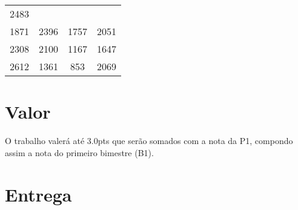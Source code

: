 \documentclass[a4paper]{article}
\begin{document}
\begin{longtable}[c]{@{}cccc@{}}
\begin{minipage}[t]{0.06\columnwidth}
2483
\strut\end{minipage}\tabularnewline
\begin{minipage}[t]{0.06\columnwidth}\centering\strut
1871
\strut\end{minipage} &
\begin{minipage}[t]{0.06\columnwidth}\centering\strut
2396
\strut\end{minipage} &
\begin{minipage}[t]{0.06\columnwidth}\centering\strut
1757
\strut\end{minipage} &
\begin{minipage}[t]{0.06\columnwidth}\centering\strut
2051
\strut\end{minipage}\tabularnewline
\begin{minipage}[t]{0.06\columnwidth}\centering\strut
2308
\strut\end{minipage} &
\begin{minipage}[t]{0.06\columnwidth}\centering\strut
2100
\strut\end{minipage} &
\begin{minipage}[t]{0.06\columnwidth}\centering\strut
1167
\strut\end{minipage} &
\begin{minipage}[t]{0.06\columnwidth}\centering\strut
1647
\strut\end{minipage}\tabularnewline
\begin{minipage}[t]{0.06\columnwidth}\centering\strut
2612
\strut\end{minipage} &
\begin{minipage}[t]{0.06\columnwidth}\centering\strut
1361
\strut\end{minipage} &
\begin{minipage}[t]{0.06\columnwidth}\centering\strut
853
\strut\end{minipage} &
\begin{minipage}[t]{0.06\columnwidth}\centering\strut
2069
\strut\end{minipage}\tabularnewline
\bottomrule
\end{longtable}

\section{Valor}
O trabalho valerá até $3.0$pts que serão somados com a nota da P1, compondo assim a nota do primeiro bimestre (B1).

\section{Entrega}
\end{document}
